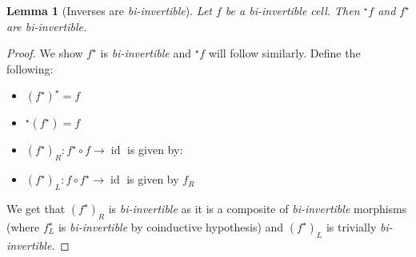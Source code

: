\documentclass{article}
\newtheorem{lemma}{Lemma}
\theoremstyle{definition}
\theoremstyle{examplestyle}
\DeclareMathOperator{\id}{id}
\newcommand{\linv}[1]{{}^\star\!#1}
\newcommand{\rinv}[1]{#1^\star}
\begin{document}
\begin{lemma}[Inverses are \emph{bi-invertible}]
  \label{lem:inverses}
  Let \(f\) be a \emph{bi-invertible} cell. Then \(\linv f\) and \(\rinv f\) are \emph{bi-invertible}.
\end{lemma}
\begin{proof}
  We show \(\rinv f\) is \emph{bi-invertible} and \(\linv f\) will follow similarly. Define the following:
  \begin{itemize}
  \item \(\rinv {(\rinv f)} = f\)
  \item \(\linv {(\rinv f)} = f\)
  \item \((\rinv f)_R: \rinv f \circ f \to \id\) is given by:
    \begin{center}
    \end{center}
  \item \((\rinv f)_L: f \circ \rinv f \to \id\) is given by \(f_R\)
  \end{itemize}
  We get that \((\rinv f)_R\) is \emph{bi-invertible} as it is a composite of \emph{bi-invertible} morphisms (where \(\rinv {f_L}\) is \emph{bi-invertible} by coinductive hypothesis) and \((\rinv f)_L\) is trivially \emph{bi-invertible}.
\end{proof}
\end{document}
